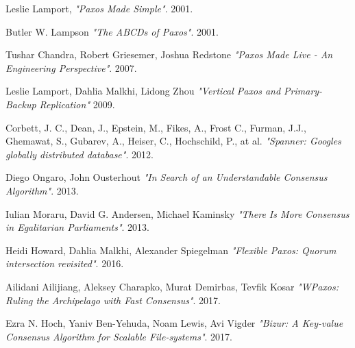 \documentclass[12pt]{article}
\theoremstyle{definition}
\begin{document}
\begin{thebibliography}{9}

  Leslie Lamport,
  \emph{"Paxos Made Simple"}.
  2001.

  Butler W. Lampson
  \emph{"The ABCDs of Paxos"}.
  2001.

  Tushar Chandra, Robert Griesemer, Joshua Redstone
  \emph{"Paxos Made Live - An Engineering Perspective"}.
  2007.

  Leslie Lamport, Dahlia Malkhi, Lidong Zhou
  \emph{"Vertical Paxos and Primary-Backup Replication"}
  2009.

  Corbett, J. C., Dean, J., Epstein, M., Fikes, A., Frost C., Furman, J.J., Ghemawat, S., Gubarev, A., Heiser, C., Hochschild, P., at al.
  \emph{"Spanner: Googles globally distributed database"}.
  2012.

  Diego Ongaro, John Ousterhout
  \emph{"In Search of an Understandable Consensus Algorithm"}.
  2013.

  Iulian Moraru, David G. Andersen, Michael Kaminsky
  \emph{"There Is More Consensus in Egalitarian Parliaments"}.
  2013.

  Heidi Howard, Dahlia Malkhi, Alexander Spiegelman
  \emph{"Flexible Paxos: Quorum intersection revisited"}.
  2016.

  Ailidani Ailijiang, Aleksey Charapko, Murat Demirbas, Tevfik Kosar
  \emph{"WPaxos: Ruling the Archipelago with Fast Consensus"}.
  2017.

  Ezra N. Hoch, Yaniv Ben-Yehuda, Noam Lewis, Avi Vigder
  \emph{"Bizur: A Key-value Consensus Algorithm for Scalable File-systems"}.
  2017.

\end{thebibliography}
\end{document}
